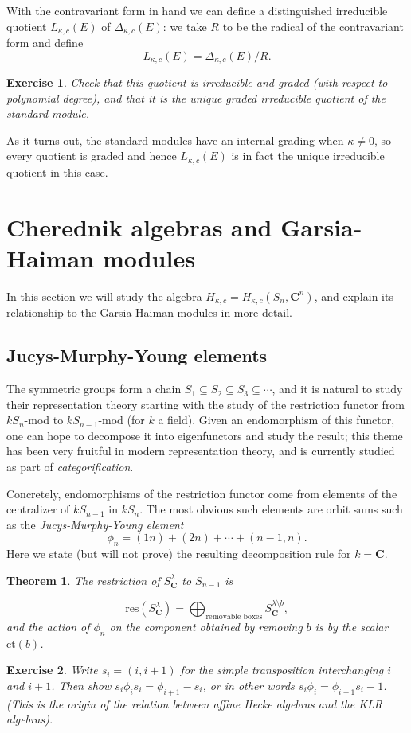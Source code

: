 \documentclass[12pt, reqno]{amsart}
\numberwithin{equation}{section}
\theoremstyle{definition}
\theoremstyle{plain}
\newtheorem{theorem}{Theorem}[section]
\newtheorem{exercise}{Exercise}
\newcommand{\CC}{\mathbf{C}}
\begin{document}
With the contravariant form in hand we can define a distinguished irreducible quotient $L_{\kappa,c}(E)$ of $\Delta_{\kappa,c}(E)$: we take $R$ to be the radical of  the contravariant form and define
$$L_{\kappa,c}(E)=\Delta_{\kappa,c}(E)/R.$$

\begin{exercise}
Check that this quotient is irreducible and graded (with respect to polynomial degree), and that it is the unique graded irreducible quotient of the standard module.\end{exercise}
As it turns out, the standard modules have an internal grading when $\kappa \neq 0$, so every quotient is graded and hence $L_{\kappa,c}(E)$ is in fact the unique irreducible quotient in this case.

\section{Cherednik algebras and Garsia-Haiman modules}

In this section we will study the algebra $H_{\kappa,c}=H_{\kappa,c}(S_n,\CC^n)$, and explain its relationship to the Garsia-Haiman modules in more detail.

\subsection{Jucys-Murphy-Young elements} The symmetric groups form a chain $S_1 \subseteq S_2 \subseteq S_3 \subseteq \cdots$, and it is natural to study their representation theory starting with the study of the restriction functor from $k S_n$-mod to $k S_{n-1}$-mod (for $k$ a field). Given an endomorphism of this functor, one can hope to decompose it into eigenfunctors and study the result; this theme has been very fruitful in modern representation theory, and is currently studied as part of \emph{categorification}. 

Concretely, endomorphisms of the restriction functor come from elements of the centralizer of $k S_{n-1}$ in $k S_n$. The most obvious such elements are orbit sums such as the \emph{Jucys-Murphy-Young element} 
$$\phi_n=(1n)+(2n)+\cdots+(n-1,n).$$ Here we state (but will not prove) the resulting decomposition rule for $k=\CC$.
\begin{theorem}
The restriction of $S^\lambda_\CC$ to $S_{n-1}$ is

$$\mathrm{res}(S^\lambda_\CC)=\bigoplus_{\text{removable boxes}} S^{\lambda \setminus b}_\CC,$$ and the action of $\phi_n$ on the component obtained by removing $b$ is by the scalar $\mathrm{ct}(b)$.
\end{theorem}
\begin{exercise}
Write $s_i=(i,i+1)$ for the simple transposition interchanging $i$ and $i+1$. Then show $s_i \phi_i s_i=\phi_{i+1}-s_i$, or in other words $s_i \phi_i=\phi_{i+1} s_i-1$. (This is the origin of the relation between affine Hecke algebras and the KLR algebras).	
\end{exercise}
\end{document}
